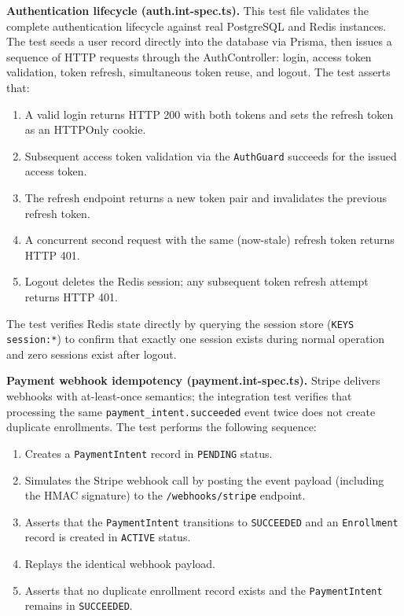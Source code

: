 \textbf{Authentication lifecycle (auth.int-spec.ts).} This test file validates the complete authentication lifecycle against real PostgreSQL and Redis instances. The test seeds a user record directly into the database via Prisma, then issues a sequence of HTTP requests through the AuthController: login, access token validation, token refresh, simultaneous token reuse, and logout. The test asserts that:

\begin{enumerate}
  \item A valid login returns HTTP 200 with both tokens and sets the refresh token as an HTTPOnly cookie.
  \item Subsequent access token validation via the \texttt{AuthGuard} succeeds for the issued access token.
  \item The refresh endpoint returns a new token pair and invalidates the previous refresh token.
  \item A concurrent second request with the same (now-stale) refresh token returns HTTP 401.
  \item Logout deletes the Redis session; any subsequent token refresh attempt returns HTTP 401.
\end{enumerate}

The test verifies Redis state directly by querying the session store (\texttt{KEYS session:*}) to confirm that exactly one session exists during normal operation and zero sessions exist after logout.

\textbf{Payment webhook idempotency (payment.int-spec.ts).} Stripe delivers webhooks with at-least-once semantics; the integration test verifies that processing the same \texttt{payment\_intent.succeeded} event twice does not create duplicate enrollments. The test performs the following sequence:

\begin{enumerate}
  \item Creates a \texttt{PaymentIntent} record in \texttt{PENDING} status.
  \item Simulates the Stripe webhook call by posting the event payload (including the HMAC signature) to the \texttt{/webhooks/stripe} endpoint.
  \item Asserts that the \texttt{PaymentIntent} transitions to \texttt{SUCCEEDED} and an \texttt{Enrollment} record is created in \texttt{ACTIVE} status.
  \item Replays the identical webhook payload.
  \item Asserts that no duplicate enrollment record exists and the \texttt{PaymentIntent} remains in \texttt{SUCCEEDED}.
\end{enumerate}

